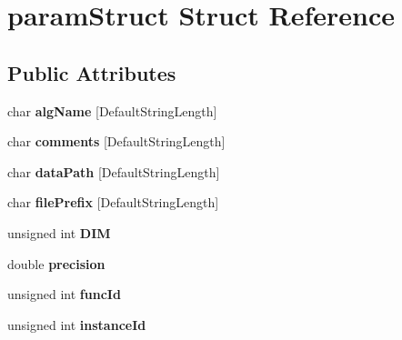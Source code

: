 \hypertarget{structparamStruct}{\section{param\-Struct Struct Reference}
\label{structparamStruct}
}
\subsection*{Public Attributes}
\begin{DoxyCompactItemize}
\item 
\hypertarget{structparamStruct_abbd779d529addcf4eb8f77b0997ecb53}{char {\bfseries alg\-Name} \mbox{[}Default\-String\-Length\mbox{]}}\label{structparamStruct_abbd779d529addcf4eb8f77b0997ecb53}

\item 
\hypertarget{structparamStruct_a802dd2bfa196bcbff1c20c1ef4e4c59c}{char {\bfseries comments} \mbox{[}Default\-String\-Length\mbox{]}}\label{structparamStruct_a802dd2bfa196bcbff1c20c1ef4e4c59c}

\item 
\hypertarget{structparamStruct_af0a0ae9d73548f364c1066bac7924b13}{char {\bfseries data\-Path} \mbox{[}Default\-String\-Length\mbox{]}}\label{structparamStruct_af0a0ae9d73548f364c1066bac7924b13}

\item 
\hypertarget{structparamStruct_ac253bc8224bfbe026880d8ddd6c15d78}{char {\bfseries file\-Prefix} \mbox{[}Default\-String\-Length\mbox{]}}\label{structparamStruct_ac253bc8224bfbe026880d8ddd6c15d78}

\item 
\hypertarget{structparamStruct_a56d9f6025d979f58c24b17b07f6441b1}{unsigned int {\bfseries D\-I\-M}}\label{structparamStruct_a56d9f6025d979f58c24b17b07f6441b1}

\item 
\hypertarget{structparamStruct_a94ea81b83107ad1e23d4d06809024f6d}{double {\bfseries precision}}\label{structparamStruct_a94ea81b83107ad1e23d4d06809024f6d}

\item 
\hypertarget{structparamStruct_a50a629c9421266d3c72ec0fad5118c03}{unsigned int {\bfseries func\-Id}}\label{structparamStruct_a50a629c9421266d3c72ec0fad5118c03}

\item 
\hypertarget{structparamStruct_af26ef586d419ba499e098a573bbdf8f1}{unsigned int {\bfseries instance\-Id}}\label{structparamStruct_af26ef586d419ba499e098a573bbdf8f1}


\end{DoxyCompactItemize}
